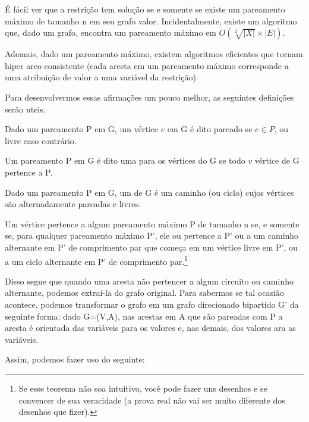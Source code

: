 \documentclass{article}
\begin{document}
É fácil ver que a restrição  tem solução se e somente se existe um pareamento máximo de tamanho n em seu grafo valor. Incidentalmente, existe um algoritmo que, dado um grafo, encontra um pareamento máximo em $O(\sqrt[2]{|X|}\times|E|)$.

Ademais, dado um pareamento máximo, existem algoritmos eficientes que tornam  hiper arco consistente (cada aresta em um pareamento máximo corresponde a uma atribuição de valor a uma variável da restrição).

Para desenvolvermos essas afirmações um pouco melhor, as seguintes definições serão uteis.

\begin{definition}
  Dado um pareamento P em G, um vértice $e$ em G é dito pareado se $e\in P$, ou livre caso contrário.
\end{definition}

\begin{definition}
  Um pareamento P em G é dito uma  para os vértices do G se todo $v$ vértice de G pertence a P.
\end{definition}

\begin{definition}
  Dado um pareamento P em G, um  de G é um caminho (ou ciclo) cujos vértices são alternadamente pareadas e livres.
\end{definition}

\begin{theorem}
  Um vértice pertence a algum pareamento máximo P de tamanho n se, e somente se, para qualquer pareamento máximo P', ele ou pertence a P' ou a um caminho alternante em P' de comprimento par que começa em um vértice livre em P', ou a um ciclo alternante
  em P' de comprimento par.\footnote{Se esse teorema não soa intuitivo, você pode fazer uns desenhos e se convencer de sua veracidade (a prova real não vai ser muito diferente dos desenhos que fizer).}
\end{theorem}

Disso segue que quando uma aresta não pertencer a algum circuito ou caminho alternante, podemos extraí-la do grafo original.
Para sabermos se tal ocasião acontece, podemos transformar o grafo em um grafo direcionado bipartido G' da seguinte forma:
dado G=(V,A), nas arestas em A que são pareadas com P a aresta é orientada das variáveis para os valores e, nas demais, dos valores ara as variáveis.

Assim, podemos fazer uso do seguinte:
\end{document}
